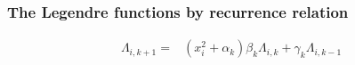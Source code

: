 \documentclass[sans,mathserif]{beamer}
\begin{document}
\renewcommand{\P}{\widetilde{P}}
\begin{frame}
  \frametitle{The Legendre functions by recurrence relation}

 \begin{equation*}
    \begin{split}
        \Lambda_{i,k+1} =& (x_i^2 + \alpha_{k}) \beta_{k} \Lambda_{i,k}
        + \gamma_{k} \Lambda_{i,k-1}
      \end{split}
    \end{equation*}

  \begin{center}
\end{center}
\end{frame}
\end{document}
